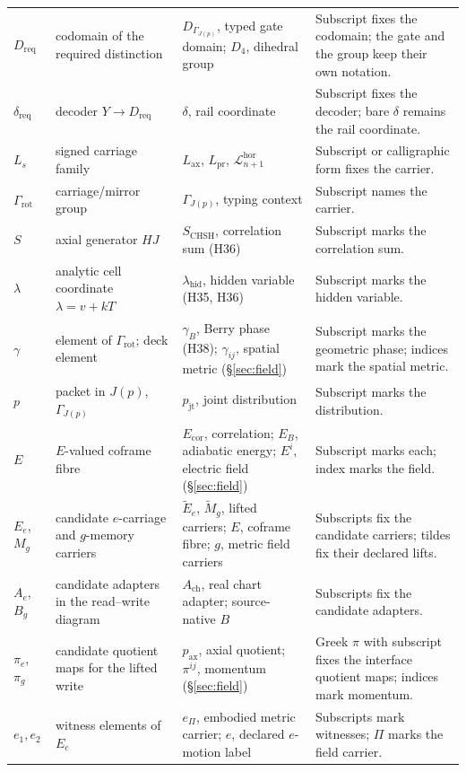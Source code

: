 \documentclass[11pt,a4paper]{article}
\newcommand{\Lax}{L_{\mathrm{ax}}}\newcommand{\Lpr}{L_{\mathrm{pr}}}
\newcommand{\Grot}{\Gamma_{\mathrm{rot}}}\newcommand{\Dfour}{D_4}
\newcommand{\Ach}{A_{\mathrm{ch}}}\newcommand{\Zch}{Z_{\mathrm{ch}}}
\theoremstyle{plain}
\theoremstyle{definition}
\theoremstyle{remark}
\begin{document}
{\begin{longtable}{@{}>{\raggedright\arraybackslash}p{1.9cm}>{\raggedright\arraybackslash}p{4.0cm}>{\raggedright\arraybackslash}p{4.9cm}>{\raggedright\arraybackslash}p{4.0cm}@{}}
$D_{\mathrm{req}}$ & codomain of the required distinction & $D_{\Gamma_{J(p)}}$, typed gate domain; $\Dfour$, dihedral group & Subscript fixes the codomain; the gate and the group keep their own notation.\\
$\delta_{\mathrm{req}}$ & decoder $Y\to D_{\mathrm{req}}$ & $\delta$, rail coordinate & Subscript fixes the decoder; bare $\delta$ remains the rail coordinate.\\
$L_s$ & signed carriage family & $\Lax$, $\Lpr$, $\mathcal L^{\mathrm{hor}}_{n+1}$ & Subscript or calligraphic form fixes the carrier.\\
$\Grot$ & carriage/mirror group & $\Gamma_{J(p)}$, typing context & Subscript names the carrier.\\
$S$ & axial generator $HJ$ & $S_{\mathrm{CHSH}}$, correlation sum (H36) & Subscript marks the correlation sum.\\
$\lambda$ & analytic cell coordinate $\lambda=v+kT$ & $\lambda_{\mathrm{hid}}$, hidden variable (H35, H36) & Subscript marks the hidden variable.\\
$\gamma$ & element of $\Grot$; deck element & $\gamma_B$, Berry phase (H38); $\gamma_{ij}$, spatial metric (\S\ref{sec:field}) & Subscript marks the geometric phase; indices mark the spatial metric.\\
$p$ & packet in $J(p)$, $\Gamma_{J(p)}$ & $p_{\mathrm{jt}}$, joint distribution & Subscript marks the distribution.\\
$E$ & $E$-valued coframe fibre & $E_{\mathrm{cor}}$, correlation; $E_B$, adiabatic energy; $E^i$, electric field (\S\ref{sec:field}) & Subscript marks each; index marks the field.\\
$E_e$, $M_g$ & candidate $e$-carriage and $g$-memory carriers & $\tilde E_e$, $\tilde M_g$, lifted carriers; $E$, coframe fibre; $g$, metric field carriers & Subscripts fix the candidate carriers; tildes fix their declared lifts.\\
$A_e$, $B_g$ & candidate adapters in the read--write diagram & $\Ach$, real chart adapter; source-native $B$ & Subscripts fix the candidate adapters.\\
$\pi_e$, $\pi_g$ & candidate quotient maps for the lifted write & $p_{\mathrm{ax}}$, axial quotient; $\pi^{ij}$, momentum (\S\ref{sec:field}) & Greek $\pi$ with subscript fixes the interface quotient maps; indices mark momentum.\\
$e_1,e_2$ & witness elements of $E_e$ & $e_\Pi$, embodied metric carrier; $e$, declared $e$-motion label & Subscripts mark witnesses; $\Pi$ marks the field carrier.\\

\end{longtable}}
\end{document}
